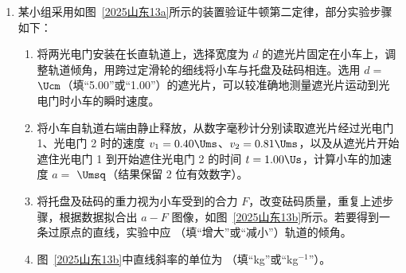 \documentclass[\gkver]{gaokaozhenti}
\begin{document}
\begin{enumerate}
{由牛顿第二定律有 $qE = ma$

联立解得 $E = \frac{4mL}{qt_{0}^{2}}$

A 正确；

B．粒子在区域 Ⅱ 中运动的 $y-t$ 图像为正弦曲线的一部分，可以判断粒子做匀速圆周运动，


运动轨迹如图所示，则粒子在区域 Ⅱ 内圆周运动的半径 $R = \frac{10}{3}L$

B 错误；

C．粒子做类平抛运动进入匀强磁场时的速度 $v = \sqrt{v_{0}^{2} + (at)^{2}}$

联立解得 $v = \frac{5L}{t_{0}}$

根据洛伦兹力提供向心力有 $qvB = m\frac{v^{2}}{R}$

解得 $B = \frac{3m}{2qt_{0}}$

C 错误；

D．如图所示，


设圆心为 $O'$ 点，设粒子进入匀强磁场时的速度方向与竖直方向夹角为 $\theta$

由速度关系有 $\sin\theta = \frac{v_{0}}{v} = 0.6$

可得 $\theta = 37^{\circ}$

由几何关系得 $\angle O' = 37^{\circ}$

那么有 $OO' = 3L + R\cos 37^{\circ} = \frac{17}{3}L$

粒子在区域 Ⅱ 内圆周运动的圆心坐标 $\left(\frac{17}{3}L, 0\right)$

D 正确。

故选 AD。
}

\item
某小组采用如图~\ref{2025山东13a}所示的装置验证牛顿第二定律，部分实验步骤如下：
\begin{enumerate}
	\item
	将两光电门安装在长直轨道上，选择宽度为 $d$ 的遮光片固定在小车上，调整轨道倾角，用跨过定滑轮的细线将小车与托盘及砝码相连。选用 $d = $  $\Ucm$（填“5.00”或“1.00”）的遮光片，可以较准确地测量遮光片运动到光电门时小车的瞬时速度。
	\item
	将小车自轨道右端由静止释放，从数字毫秒计分别读取遮光片经过光电门 1、光电门 2 时的速度 $v_{1} = 0.40 \Ums$、$v_{2} = 0.81 \Ums$，以及从遮光片开始遮住光电门 1 到开始遮住光电门 2 的时间 $t = 1.00 \Us$，计算小车的加速度 $a = $  $\Umsq$（结果保留 2 位有效数字）。
	\item
	将托盘及砝码的重力视为小车受到的合力 $F$，改变砝码质量，重复上述步骤，根据数据拟合出 $a-F$ 图像，如图~\ref{2025山东13b}所示。若要得到一条过原点的直线，实验中应 （填“增大”或“减小”）轨道的倾角。
	\item
	图~\ref{2025山东13b}中直线斜率的单位为 （填“kg”或“kg$^{-1}$”）。
\end{enumerate}


\end{enumerate}
\end{document}
